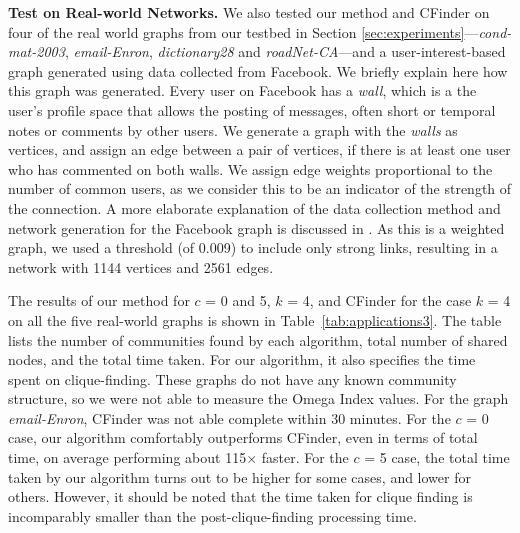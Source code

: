 {\bf Test on Real-world Networks. } We also tested our method and CFinder on four of the real world graphs from our testbed in Section \ref{sec:experiments}---{\em cond-mat-2003}, {\em email-Enron}, {\em dictionary28} and {\em roadNet-CA}---and a user-interest-based graph generated using data collected from Facebook. We briefly explain here how this graph was generated.
Every user on Facebook has a {\it wall}, which is a the user's profile space that allows the posting of messages, often short or temporal notes or comments by other users. We generate a graph with the {\it walls} as vertices, and assign an edge between a pair of vertices, if there is at least one user who has commented on both walls. We assign edge weights proportional to the number of common users, as we consider this to be an indicator of the strength of the connection. A more elaborate explanation of the data collection method and network generation  for the Facebook graph is discussed in \cite{dianapaper}. As this is a weighted graph, we used a threshold (of 0.009) to include only strong links, resulting in a network with 1144 vertices and 2561 edges.

The results of our method for $c$ = 0 and 5, $k$ = 4, and CFinder for the case $k$ = 4 on all the five real-world graphs is shown in  Table~\ref{tab:applications3}. The table lists the number of communities found by each algorithm, total number of shared nodes, and the total time taken. For our algorithm, it also specifies the time spent on clique-finding. These graphs do not have any known community structure, so we were not able to measure the Omega Index values. For the graph {\em email-Enron}, CFinder was not able complete within 30 minutes. For the $c$ = 0 case, our algorithm comfortably outperforms CFinder, even in terms of total time, on average performing about 115$\times$ faster. For the $c$ = 5 case, the total time taken by our algorithm turns out to be higher for some cases, and lower for others. However, it should be noted that the time taken for clique finding is incomparably smaller than the post-clique-finding processing time. 











